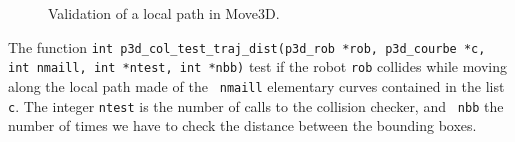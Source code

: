 \begin{figure}[hbt]
\centerline{
}
\caption{\small 
Validation of a local path in Move3D.
}
\label{FIG_VALID}
\end{figure}  

The function {\tt int p3d\_col\_test\_traj\_dist(p3d\_rob *rob,
p3d\_courbe *c, int nmaill, int *ntest, int *nbb)}
 test if the robot
{\tt rob} collides while moving along the local path made of the {\tt
nmaill} elementary curves contained in the list {\tt c}. The integer
{\tt ntest} is the number of calls to the collision checker, and {\tt
nbb} the number of times we have to check the distance between the
bounding boxes.



